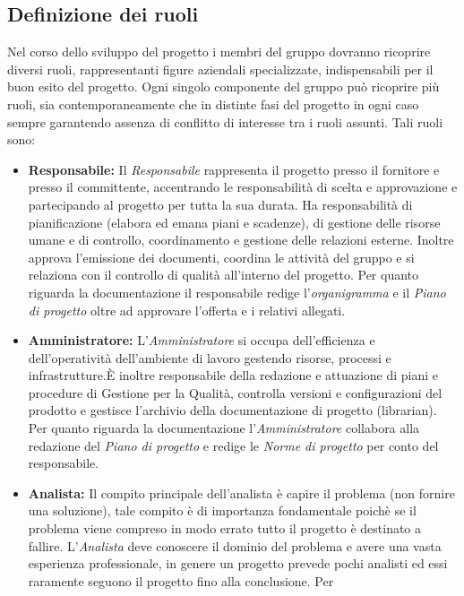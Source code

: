 \documentclass[a4paper]{report}
\begin{document}
\begin{appendices}
		\section{Definizione dei ruoli}
			Nel corso dello sviluppo del progetto i membri del gruppo dovranno ricoprire diversi ruoli, rappresentanti 
			figure aziendali specializzate, indispensabili per il buon esito del progetto. Ogni singolo componente del 
			gruppo può ricoprire più ruoli, sia contemporaneamente che in distinte fasi del progetto in ogni caso 
			sempre garantendo assenza di conflitto di interesse tra i ruoli assunti.
			Tali ruoli sono:
			\begin{itemize}
				\item \textbf{Responsabile:} Il \emph{Responsabile} rappresenta il progetto presso il fornitore e presso 
				il committente, accentrando le responsabilità di scelta e approvazione e partecipando al progetto per tutta 
				la sua durata. Ha responsabilità di pianificazione (elabora ed emana piani e scadenze), di gestione delle 
				risorse umane e di controllo, coordinamento e gestione delle relazioni esterne. Inoltre approva l'emissione 
				dei documenti, coordina le attività del gruppo e si relaziona con il controllo di qualità all'interno del 
				progetto. Per quanto riguarda la documentazione il responsabile redige l'\emph{organigramma} e il 
				\emph{Piano di progetto} oltre ad approvare l'offerta e i relativi allegati.
				\item \textbf{Amministratore:} L'\emph{Amministratore} si occupa dell'efficienza e dell'operatività dell'ambiente 
				di lavoro gestendo risorse, processi e infrastrutture.È inoltre responsabile della redazione e attuazione di piani 
				e procedure di Gestione per la Qualità, controlla versioni e configurazioni del prodotto e gestisce l'archivio 
				della documentazione di progetto (librarian). Per quanto riguarda la documentazione l'\emph{Amministratore} 
				collabora alla redazione del \emph{Piano di progetto} e redige le \emph{Norme di progetto} per conto del responsabile.
				\item \textbf{Analista:} Il compito principale dell'analista è capire il problema (non fornire una soluzione),
				tale compito è di importanza fondamentale poichè se il problema viene compreso in modo errato tutto il progetto 
				è destinato a fallire. L'\emph{Analista} deve conoscere il dominio del problema e avere una vasta esperienza professionale, 
				in genere un progetto prevede pochi analisti ed essi raramente seguono il progetto fino alla conclusione. Per 

\end{itemize}
\end{appendices}
\end{document}

